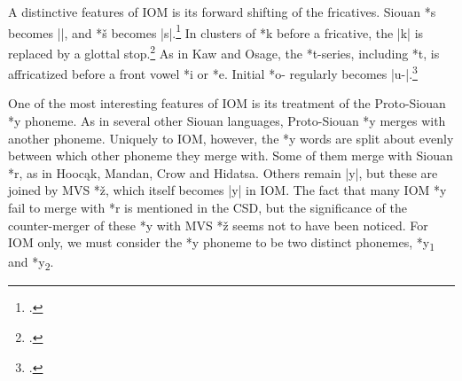 \documentclass[output=paper]{LSP/langsci}
\begin{document}
A distinctive features of IOM is its forward shifting of the fricatives.  Siouan *s becomes ||, and *š becomes |s|.\footnote{\citealt[245]{CSD2006}. } In clusters of *k before a fricative, the |k| is replaced by a glottal stop.\footnote{\citealt[857]{CSD2006}.}  As in Kaw and Osage, the *t-series, including *t\textsuperscript{}, is affricatized before a front vowel *i or *e.  Initial *o- regularly becomes |u-|.\footnote{\citealt[893]{CSD2006}.}

One of the most interesting features of IOM is its treatment of the Proto-Siouan *y phoneme.  As in several other Siouan languages, Proto-Siouan *y merges with another phoneme.  Uniquely to IOM, however, the *y words are split about evenly between which other phoneme they merge with.  Some of them merge with Siouan *r, as in Hooc\k{a}k, Mandan, Crow and Hidatsa.  Others remain |y|, but these are joined by MVS *\v{z}, which itself becomes |y| in IOM.  The fact that many IOM *y fail to merge with *r is mentioned in the CSD, but the significance of the counter-merger of these *y with MVS *\v{z} seems not to have been noticed.  For IOM only, we must consider the *y phoneme to be two distinct phonemes, *y\textsubscript{1} and *y\textsubscript{2}.
\end{document}
